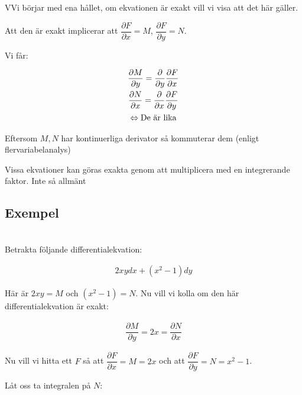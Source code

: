 \begin{prf}
   VVi börjar med ena hållet, om ekvationen är exakt vill vi visa att det här gäller.
  \par\bigskip
  \noindent Att den är exakt implicerar att $\dfrac{\partial F}{\partial x}=M$, $\dfrac{\partial F}{\partial y}=N$.
  \par\bigskip
  \noindent  Vi får:

  \begin{equation*}
    \begin{gathered}
      \dfrac{\partial M}{\partial y}= \dfrac{\partial}{\partial y}\dfrac{\partial F}{\partial x}\\
      \dfrac{\partial N}{\partial x}=\dfrac{\partial}{\partial x}\dfrac{\partial F}{\partial y}\\
      \Leftrightarrow \text{De är lika}
    \end{gathered}
  \end{equation*}
  \par\bigskip
  Eftersom $M,N$ har kontinuerliga derivator så kommuterar dem (enligt flervariabelanalys)
  \par\bigskip

  Vissa ekvationer kan göras exakta genom att multiplicera med en integrerande faktor. Inte så allmänt
  \par\bigskip
\end{prf}
\par\bigskip

\subsection{Exempel}\hfill\\
\noindent Betrakta följande differentialekvation:


\begin{equation*}
  \begin{gathered}
    2xydx+(x^2-1)dy
  \end{gathered}
\end{equation*}
\par\bigskip

\noindent Här är $2xy=M$ och $(x^2-1)=N$. Nu vill vi kolla om den här differentialekvation är exakt:


\begin{equation*}
  \begin{gathered}
    \dfrac{\partial M}{\partial y}= 2x = \dfrac{\partial N}{\partial x}
  \end{gathered}
\end{equation*}
\par\bigskip
\noindent Nu vill vi hitta ett $F$ så att $\dfrac{\partial F}{\partial x} = M = 2x$ och att $\dfrac{\partial F}{\partial y}=N=x^2-1$.
\par\bigskip
\noindent Låt oss ta integralen på $N$:

